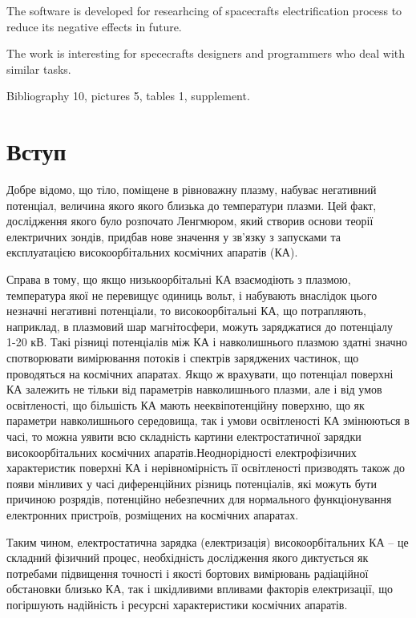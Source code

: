\documentclass[a4paper,12pt]{article}
\begin{document}
The software is developed for researhcing of spacecrafts electrification process to reduce its negative effects in future.

The work is interesting for spececrafts designers and programmers who deal with similar tasks.

Bibliography 10, pictures 5, tables 1, supplement.

\newpage

\tableofcontents

\newpage

\section*{Вступ}
Добре відомо, що тіло, поміщене в рівноважну плазму, набуває негативний потенціал, величина якого якого близька до температури плазми. Цей факт, дослідження якого було розпочато Ленгмюром, який створив основи теорії електричних зондів, придбав нове значення у зв'язку з запусками та експлуатацією високоорбітальних космічних апаратів (КА).

Справа в тому, що якщо низькоорбітальні КА взаємодіють з плазмою, температура якої не перевищує одиниць вольт, і набувають внаслідок цього незначні негативні потенціали, то високоорбітальні КА, що потрапляють, наприклад, в плазмовий шар магнітосфери, можуть заряджатися до потенціалу ~ 1-20 кВ. Такі різниці потенціалів між КА і навколишнього плазмою здатні значно спотворювати вимірювання потоків і спектрів заряджених частинок, що проводяться на космічних апаратах. Якщо ж врахувати, що потенціал поверхні КА залежить не тільки від параметрів навколишнього плазми, але і від умов освітленості, що більшість КА мають нееквіпотенційну поверхню, що як параметри навколишнього середовища, так і умови освітленості КА змінюються в часі, то можна уявити всю складність картини електростатичної зарядки високоорбітальних космічних апаратів.Неоднорідності електрофізичних характеристик поверхні КА і нерівномірність її освітленості призводять також до появи мінливих у часі диференційних різниць потенціалів, які можуть бути 
причиною розрядів, потенційно небезпечних для нормального функціонування електронних пристроїв, розміщених на космічних апаратах.

Таким чином, електростатична зарядка (електризація) високоорбітальних КА -- це складний фізичний процес, необхідність дослідження якого диктується як потребами підвищення точності і якості бортових вимірювань радіаційної обстановки близько КА, так і шкідливими впливами факторів електризації, що погіршують надійність і ресурсні характеристики космічних апаратів.
\end{document}
